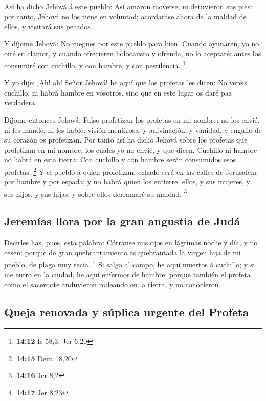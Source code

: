  Así ha dicho Jehová á este pueblo: Así amaron moverse, ni
detuvieron sus pies: por tanto, Jehová no los tiene en voluntad;
acordaráse ahora de la maldad de ellos, y visitará sus pecados.

 Y díjome Jehová: No ruegues por este pueblo para bien.
 Cuando ayunaren, yo no oiré su clamor, y cuando ofrecieren
holocausto y ofrenda, no lo aceptaré; antes los consumiré con cuchillo,
y con hambre, y con pestilencia. \footnote{\textbf{14:12} Is 58,3; Jer
  6,20}

 Y yo dije: ¡Ah! ah! Señor Jehová! he aquí que los profetas
les dicen: No veréis cuchillo, ni habrá hambre en vosotros, sino que en
este lugar os daré paz verdadera.

 Díjome entonces Jehová: Falso profetizan los profetas en
mi nombre: no los envié, ni les mandé, ni les hablé: visión mentirosa, y
adivinación, y vanidad, y engaño de su corazón os profetizan.
 Por tanto así ha dicho Jehová sobre los profetas que
profetizan en mi nombre, los cuales yo no envié, y que dicen, Cuchillo
ni hambre no habrá en esta tierra: Con cuchillo y con hambre serán
consumidos esos profetas. \footnote{\textbf{14:15} Deut 18,20}
 Y el pueblo á quien profetizan, echado será en las calles
de Jerusalem por hambre y por espada; y no habrá quien los entierre,
ellos, y sus mujeres, y sus hijos, y sus hijas; y sobre ellos derramaré
su maldad. \footnote{\textbf{14:16} Jer 8,2}

\hypertarget{jeremuxedas-llora-por-la-gran-angustia-de-juduxe1}{%
\subsection{Jeremías llora por la gran angustia de
Judá}\label{jeremuxedas-llora-por-la-gran-angustia-de-juduxe1}}

 Decirles has, pues, esta palabra: Córranse mis ojos en
lágrimas noche y día, y no cesen; porque de gran quebrantamiento es
quebrantada la virgen hija de mi pueblo, de plaga muy recia. \footnote{\textbf{14:17}
  Jer 8,23}  Si salgo al campo, he aquí muertos á cuchillo;
y si me entro en la ciudad, he aquí enfermos de hambre: porque también
el profeta como el sacerdote anduvieron rodeando en la tierra, y no
conocieron.

\hypertarget{queja-renovada-y-suxfaplica-urgente-del-profeta}{%
\subsection{Queja renovada y súplica urgente del
Profeta}\label{queja-renovada-y-suxfaplica-urgente-del-profeta}}


